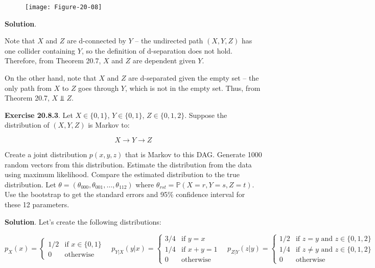 \begin{figure}[H]
\texttt{[image: Figure-20-08]}
\end{figure}

\textbf{Solution}.

Note that \(X\) and \(Z\) are d-connected by \(Y\) -- the undirected
path \((X, Y, Z)\) has one collider containing \(Y\), so the definition
of d-separation does not hold. Therefore, from Theorem 20.7, \(X\) and
\(Z\) are dependent given \(Y\).

On the other hand, note that \(X\) and \(Z\) are d-separated given the
empty set -- the only path from \(X\) to \(Z\) goes through \(Y\), which
is not in the empty set. Thus, from Theorem 20.7, \(X \text{ ⫫ } Z\).

\textbf{Exercise 20.8.3}. Let \(X \in \{0, 1\}\), \(Y \in \{0, 1\}\),
\(Z \in \{ 0, 1, 2 \}\). Suppose the distribution of \((X, Y, Z)\) is
Markov to:

\[ X \longrightarrow Y \longrightarrow Z \]

Create a joint distribution \(p(x, y, z)\) that is Markov to this DAG.
Generate 1000 random vectors from this distribution. Estimate the
distribution from the data using maximum likelihood. Compare the
estimated distribution to the true distribution. Let
\(\theta = (\theta_{000}, \theta_{001}, \dots, \theta_{112})\) where
\(\theta_{rst} = \mathbb{P}(X = r, Y = s, Z = t)\). Use the bootstrap to
get the standard errors and 95\% confidence interval for these 12
parameters.

\textbf{Solution}. Let's create the following distributions:

\[ p_X(x) = \begin{cases}
1/2 & \text{if } x \in \{0, 1\} \\
0 & \text{otherwise}
\end{cases}
\quad
p_{Y | X}(y | x) = \begin{cases}
3/4 & \text{if } y = x \\
1/4 & \text{if } x + y = 1 \\
0 & \text{otherwise}
\end{cases}
\quad
p_{Z | Y}(z | y) = \begin{cases}
1/2 &\text{if } z = y \text{ and } z \in \{ 0, 1, 2 \}\\
1/4 &\text{if } z \neq y \text{ and } z \in \{ 0, 1, 2 \} \\
0 &\text{otherwise}
\end{cases}
\]

